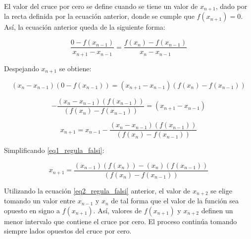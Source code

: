 El valor del cruce por cero se define cuando se tiene un valor de $ x_{n+1} $, dado por la recta definida por la ecuación anterior, donde se cumple que $ f(x_{n+1}) = 0 $.\newline\newline
Así, la ecuación anterior queda de la siguiente forma:

\begin{displaymath}
    \frac{0 - f(x_{n-1})}{x_{n+1} - x_{n-1}} = \frac{f(x_n) - f(x_{n-1})}{x_n - x_{n-1}}
\end{displaymath}

Despejando $ x_{n+1} $ se obtiene:

\begin{displaymath}
    (x_n - x_{n-1})(0 - f(x_{n-1})) = (x_{n+1} - x_{n-1})(f(x_n) - f(x_{n-1}))
\end{displaymath}

\begin{displaymath}
    -\frac{(x_n - x_{n-1})(f(x_{n-1}))}{(f(x_n) - f(x_{n-1}))} = (x_{n+1} - x_{n-1})
\end{displaymath}

\begin{equation}
    \label{eq1_regula_falsi}
    x_{n+1} = x_{n-1} - \frac{(x_n - x_{n-1})(f(x_{n-1}))}{(f(x_n) - f(x_{n-1}))}
\end{equation}

Simplificando \eqref{eq1_regula_falsi}:

\begin{equation}
    \label{eq2_regula_falsi}
    x_{n+1} = \frac{(x_{n-1})(f(x_n)) - (x_n)(f(x_{n-1}))}{(f(x_n) - f(x_{n-1}))}
\end{equation}

Utilizando la ecuación \eqref{eq2_regula_falsi} anterior, el valor de $ x_{n+2} $ se elige tomando un valor entre $ x_{n-1} $ y $ x_n $ de tal forma que el valor de la función sea opuesto en signo a $ f(x_{n+1}) $. Así, valores de $ f(x_{n+1}) $ y $ x_{n+2} $ definen un menor intervalo que contiene el cruce por cero. El proceso continúa tomando siempre lados opuestos del cruce por cero. 